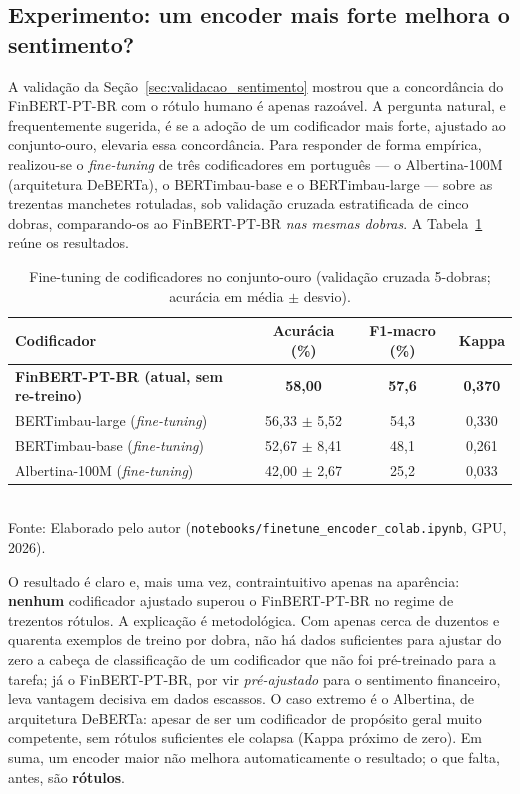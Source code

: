\subsection{Experimento: um encoder mais forte melhora o sentimento?}
\label{sec:experimento_encoder}

A validação da Seção~\ref{sec:validacao_sentimento} mostrou que a concordância do \mbox{FinBERT-PT-BR}
com o rótulo humano é apenas razoável. A pergunta natural, e frequentemente sugerida, é se a adoção de
um codificador mais forte, ajustado ao conjunto-ouro, elevaria essa concordância. Para responder de
forma empírica, realizou-se o \textit{fine-tuning} de três codificadores em português --- o
Albertina-100M (arquitetura DeBERTa), o BERTimbau-base e o BERTimbau-large --- sobre as trezentas
manchetes rotuladas, sob validação cruzada estratificada de cinco dobras, comparando-os ao
\mbox{FinBERT-PT-BR} \emph{nas mesmas dobras}. A Tabela~\ref{tab:experimento_encoder} reúne os resultados.

\begin{table}[htpb]
\centering
\caption{Fine-tuning de codificadores no conjunto-ouro (validação cruzada 5-dobras; acurácia em média $\pm$ desvio).}
\label{tab:experimento_encoder}
\begin{tabular}{l c c c}
\hline
\textbf{Codificador} & \textbf{Acurácia (\%)} & \textbf{F1-macro (\%)} & \textbf{Kappa} \\ \hline
\textbf{FinBERT-PT-BR (atual, sem re-treino)} & \textbf{58,00} & \textbf{57,6} & \textbf{0,370} \\
BERTimbau-large (\textit{fine-tuning}) & 56,33 $\pm$ 5,52 & 54,3 & 0,330 \\
BERTimbau-base (\textit{fine-tuning})  & 52,67 $\pm$ 8,41 & 48,1 & 0,261 \\
Albertina-100M (\textit{fine-tuning})  & 42,00 $\pm$ 2,67 & 25,2 & 0,033 \\ \hline
\end{tabular}
\vspace{0.2cm}
{\small \\ Fonte: Elaborado pelo autor (\texttt{notebooks/finetune\_encoder\_colab.ipynb}, GPU, 2026).}
\end{table}

O resultado é claro e, mais uma vez, contraintuitivo apenas na aparência: \textbf{nenhum} codificador
ajustado superou o \mbox{FinBERT-PT-BR} no regime de trezentos rótulos. A explicação é metodológica.
Com apenas cerca de duzentos e quarenta exemplos de treino por dobra, não há dados suficientes para
ajustar do zero a cabeça de classificação de um codificador que não foi pré-treinado para a tarefa; já
o \mbox{FinBERT-PT-BR}, por vir \emph{pré-ajustado} para o sentimento financeiro, leva vantagem
decisiva em dados escassos. O caso extremo é o Albertina, de arquitetura DeBERTa: apesar de ser um
codificador de propósito geral muito competente, sem rótulos suficientes ele colapsa (Kappa próximo de
zero). Em suma, um encoder maior não melhora automaticamente o resultado; o que falta, antes, são
\textbf{rótulos}.

